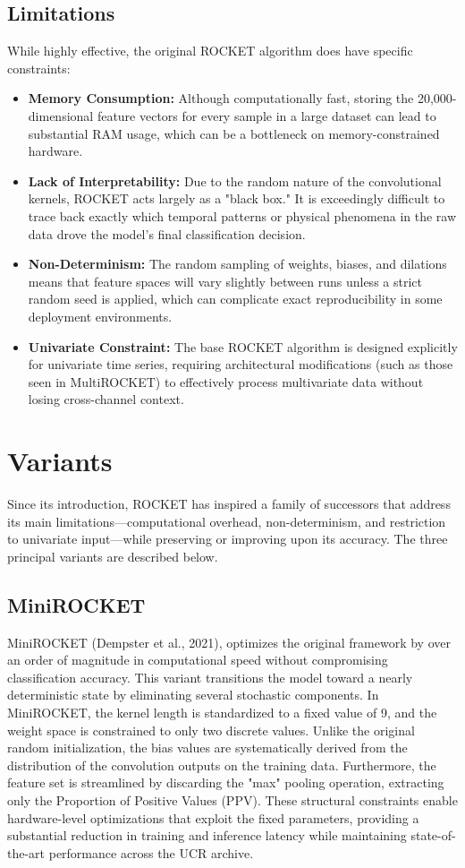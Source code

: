 \documentclass[conference]{IEEEtran}
\begin{document}
\subsection{Limitations}
While highly effective, the original ROCKET algorithm does have specific constraints:
\begin{itemize}
    \item \textbf{Memory Consumption:} Although computationally fast, storing the 20,000-dimensional feature vectors for every sample in a large dataset can lead to substantial RAM usage, which can be a bottleneck on memory-constrained hardware.
    \item \textbf{Lack of Interpretability:} Due to the random nature of the convolutional kernels, ROCKET acts largely as a "black box." It is exceedingly difficult to trace back exactly which temporal patterns or physical phenomena in the raw data drove the model's final classification decision.
    \item \textbf{Non-Determinism:} The random sampling of weights, biases, and dilations means that feature spaces will vary slightly between runs unless a strict random seed is applied, which can complicate exact reproducibility in some deployment environments.
    \item \textbf{Univariate Constraint:} The base ROCKET algorithm is designed explicitly for univariate time series, requiring architectural modifications (such as those seen in MultiROCKET) to effectively process multivariate data without losing cross-channel context.
\end{itemize}

\section{Variants}
Since its introduction, ROCKET has inspired a family of successors that address its main limitations—computational overhead, non-determinism, and restriction to univariate input—while preserving or improving upon its accuracy. The three principal variants are described below.

\subsection{MiniROCKET}
MiniROCKET (Dempster et al., 2021), optimizes the original framework by over an order of magnitude in computational speed without compromising classification accuracy. This variant transitions the model toward a nearly deterministic state by eliminating several stochastic components. In MiniROCKET, the kernel length is standardized to a fixed value of 9, and the weight space is constrained to only two discrete values. Unlike the original random initialization, the bias values are systematically derived from the distribution of the convolution outputs on the training data. Furthermore, the feature set is streamlined by discarding the "max" pooling operation, extracting only the Proportion of Positive Values (PPV). These structural constraints enable hardware-level optimizations that exploit the fixed parameters, providing a substantial reduction in training and inference latency while maintaining state-of-the-art performance across the UCR archive.
\end{document}
